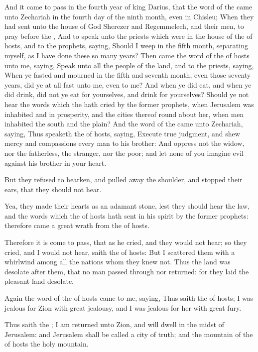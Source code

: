 \Chapter
\Verse And it came to pass in the fourth year of king Darius, that the word of the \LORD came unto Zechariah in the fourth day of the ninth month, even in Chisleu; \Verse When they had sent unto the house of God Sherezer and Regemmelech, and their men, to pray before the \LORD, \Verse And to speak unto the priests which were in the house of the \LORD of hosts, and to the prophets, saying, Should I weep in the fifth month, separating myself, as I have done these so many years?  \Verse Then came the word of the \LORD of hosts unto me, saying, \Verse Speak unto all the people of the land, and to the priests, saying, When ye fasted and mourned in the fifth and seventh month, even those seventy years, did ye at all fast unto me, even to me?  \Verse And when ye did eat, and when ye did drink, did not ye eat for yourselves, and drink for yourselves?  \Verse Should ye not hear the words which the \LORD hath cried by the former prophets, when Jerusalem was inhabited and in prosperity, and the cities thereof round about her, when men inhabited the south and the plain?  \Verse And the word of the \LORD came unto Zechariah, saying, \Verse Thus speaketh the \LORD of hosts, saying, Execute true judgment, and shew mercy and compassions every man to his brother: \Verse And oppress not the widow, nor the fatherless, the stranger, nor the poor; and let none of you imagine evil against his brother in your heart.

\Verse But they refused to hearken, and pulled away the shoulder, and stopped their ears, that they should not hear.

\Verse Yea, they made their hearts as an adamant stone, lest they should hear the law, and the words which the \LORD of hosts hath sent in his spirit by the former prophets: therefore came a great wrath from the \LORD of hosts.

\Verse Therefore it is come to pass, that as he cried, and they would not hear; so they cried, and I would not hear, saith the \LORD of hosts: \Verse But I scattered them with a whirlwind among all the nations whom they knew not. Thus the land was desolate after them, that no man passed through nor returned: for they laid the pleasant land desolate.


\Chapter
\Verse Again the word of the \LORD of hosts came to me, saying, \Verse Thus saith the \LORD of hosts; I was jealous for Zion with great jealousy, and I was jealous for her with great fury.

\Verse Thus saith the \LORD; I am returned unto Zion, and will dwell in the midst of Jerusalem: and Jerusalem shall be called a city of truth; and the mountain of the \LORD of hosts the holy mountain.

